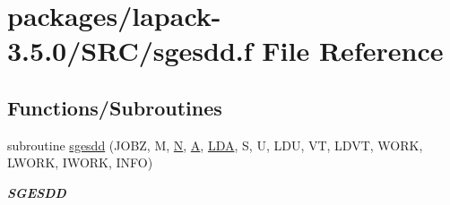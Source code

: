 \hypertarget{sgesdd_8f}{}\section{packages/lapack-\/3.5.0/\+S\+R\+C/sgesdd.f File Reference}
\label{sgesdd_8f}
\subsection*{Functions/\+Subroutines}
\begin{DoxyCompactItemize}
\item 
subroutine \hyperlink{group__realGEsing_gac2cd4f1079370ac908186d77efcd5ea8}{sgesdd} (J\+O\+B\+Z, M, \hyperlink{polmisc_8c_a0240ac851181b84ac374872dc5434ee4}{N}, \hyperlink{classA}{A}, \hyperlink{example__user_8c_ae946da542ce0db94dced19b2ecefd1aa}{L\+D\+A}, S, U, L\+D\+U, V\+T, L\+D\+V\+T, W\+O\+R\+K, L\+W\+O\+R\+K, I\+W\+O\+R\+K, I\+N\+F\+O)
\begin{DoxyCompactList}\small\item\em {\bfseries S\+G\+E\+S\+D\+D} \end{DoxyCompactList}\end{DoxyCompactItemize}
